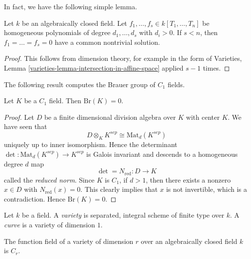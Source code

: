 \noindent
In fact, we have the following simple lemma.

\begin{lemma}
\label{lemma-algebraically-closed-find-solutions}
Let $k$ be an algebraically closed field. Let
$f_1, \ldots, f_s \in k[T_1, \ldots, T_n]$
be homogeneous polynomials of degree $d_1, \ldots, d_s$ with $d_i
> 0$. If $s < n$, then $f_1 = \ldots = f_s = 0$ have a common nontrivial
solution.
\end{lemma}

\begin{proof}
This follows from dimension theory, for example in the form of
Varieties, Lemma \ref{varieties-lemma-intersection-in-affine-space}
applied $s - 1$ times.
\end{proof}

\noindent
The following result computes the Brauer group of $C_1$ fields.

\begin{theorem}
\label{theorem-C1-brauer-group-zero}
Let $K$ be a $C_1$ field. Then $\text{Br}(K) = 0$.
\end{theorem}

\begin{proof}
Let $D$ be a finite dimensional division algebra over $K$ with center $K$. We
have seen that
$$
D \otimes_K K^{sep} \cong \text{Mat}_d(K^{sep})
$$
uniquely up to inner isomorphism. Hence the determinant $\det :
\text{Mat}_d(K^{sep}) \to K^{sep}$ is Galois invariant and descends to a
homogeneous degree $d$ map
$$
\det = N_\text{red} : D \longrightarrow K
$$
called the {\it reduced norm}. Since $K$ is $C_1$, if $d > 1$, then there
exists a nonzero $x \in D$ with $N_\text{red}(x) = 0$. This clearly implies
that $x$ is not invertible, which is a contradiction. Hence $\text{Br}(K) = 0$.
\end{proof}

\begin{definition}
\label{definition-variety}
Let $k$ be a field. A {\it variety} is separated, integral scheme of
finite type over $k$. A {\it curve} is a variety of dimension $1$.
\end{definition}

\begin{theorem}
\label{theorem-tsen}
The function field of a variety of dimension $r$ over an algebraically closed
field $k$ is $C_r$.
\end{theorem}

